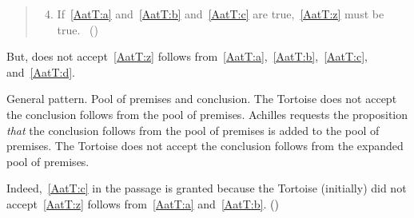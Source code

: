\begin{note}
  \begin{quote}
    \begin{enumerate}[label=(\emph{\Alph*}), ref=\emph{\Alph*}]
      \setcounter{enumi}{3}
    \item
      \label{AatT:d}
      If~\ref{AatT:a} and~\ref{AatT:b} and~\ref{AatT:c} are true,~\ref{AatT:z} must be true.%
      \mbox{ }\hfill\mbox{(\Citeyear[279]{Carroll:1895uj})}
    \end{enumerate}
  \end{quote}

  But, does not accept~\ref{AatT:z} follows from~\ref{AatT:a},~\ref{AatT:b},~\ref{AatT:c}, and~\ref{AatT:d}.

  General pattern.
  Pool of premises and conclusion.
  The Tortoise does not accept the conclusion follows from the pool of premises.
  Achilles requests the proposition \emph{that} the conclusion follows from the pool of premises is added to the pool of premises.
  The Tortoise does not accept the conclusion follows from the expanded pool of premises.

  Indeed,~\ref{AatT:c} in the passage is granted because the Tortoise (initially) did not accept~\ref{AatT:z} follows from~\ref{AatT:a} and~\ref{AatT:b}.
  (\citeyear[279]{Carroll:1895uj})
\end{note}

